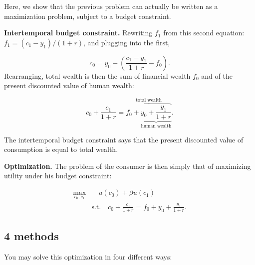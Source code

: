 \documentclass[]{book}
\theoremstyle{definition}
\theoremstyle{definition}
\theoremstyle{definition}
\theoremstyle{remark}
\begin{document}
Here, we show that the previous problem can actually be written as a
maximization problem, subject to a budget constraint.

\textbf{Intertemporal budget constraint.} Rewriting \(f_{1}\) from this
second equation: \(f_{1}=(c_{1}-y_{1})/(1+r)\), and plugging into the
first,

\[c_{0}=y_{0}-\left(\frac{c_{1}-y_{1}}{1+r}-f_{0}\right).\] Rearranging,
total wealth is then the sum of financial wealth \(f_0\) and of the
present discounted value of human wealth:

\[c_{0}+\frac{c_{1}}{1+r}=\overbrace{f_{0}+\underbrace{y_{0}+\frac{y_{1}}{1+r}}_{\text{human wealth}}}^{\text{total wealth}}.\]

The intertemporal budget constraint says that the present discounted
value of consumption is equal to total wealth.

\textbf{Optimization.} The problem of the consumer is then simply that
of maximizing utility under his budget constraint:

\[
\begin{aligned} 
\max_{c_{0},c_{1}} & \quad u(c_{0})+\beta u(c_{1}) \\
& \text{s.t.} \quad c_{0}+\frac{c_{1}}{1+r}=f_{0}+y_{0}+\frac{y_{1}}{1+r}.
\end{aligned}
\]

\subsection{4 methods}\label{methods}

You may solve this optimization in four different ways:
\end{document}
